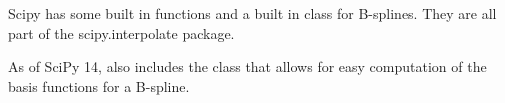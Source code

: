 Scipy has some built in functions and a built in class for B-splines.
They are all part of the scipy.interpolate package.

As of SciPy 14,  also includes the  class that allows for easy computation of the basis functions for a B-spline.

